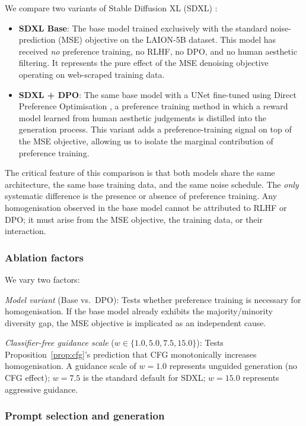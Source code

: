 \documentclass[11pt]{article}
\begin{document}
We compare two variants of Stable Diffusion XL (SDXL) \citep{Podell2023}:

\begin{itemize}
 \item \textbf{SDXL Base}: The base model trained exclusively with the standard noise-prediction (MSE) objective on the LAION-5B dataset. This model has received \textit{no} preference training, no RLHF, no DPO, and no human aesthetic filtering. It represents the pure effect of the MSE denoising objective operating on web-scraped training data.
 \item \textbf{SDXL + DPO}: The same base model with a UNet fine-tuned using Direct Preference Optimisation \citep{Rafailov2023}, a preference training method in which a reward model learned from human aesthetic judgements is distilled into the generation process. This variant adds a preference-training signal on top of the MSE objective, allowing us to isolate the marginal contribution of preference training.
\end{itemize}

The critical feature of this comparison is that both models share the same architecture, the same base training data, and the same noise schedule. The \textit{only} systematic difference is the presence or absence of preference training. Any homogenisation observed in the base model cannot be attributed to RLHF or DPO; it must arise from the MSE objective, the training data, or their interaction.

\subsubsection{Ablation factors}

We vary two factors:

\textit{Model variant} (Base vs.\ DPO): Tests whether preference training is necessary for homogenisation. If the base model already exhibits the majority/minority diversity gap, the MSE objective is implicated as an independent cause.

\textit{Classifier-free guidance scale} ($w \in \{1.0, 5.0, 7.5, 15.0\}$): Tests Proposition~\ref{prop:cfg}'s prediction that CFG monotonically increases homogenisation. A guidance scale of $w = 1.0$ represents unguided generation (no CFG effect); $w = 7.5$ is the standard default for SDXL; $w = 15.0$ represents aggressive guidance.

\subsubsection{Prompt selection and generation}
\end{document}

